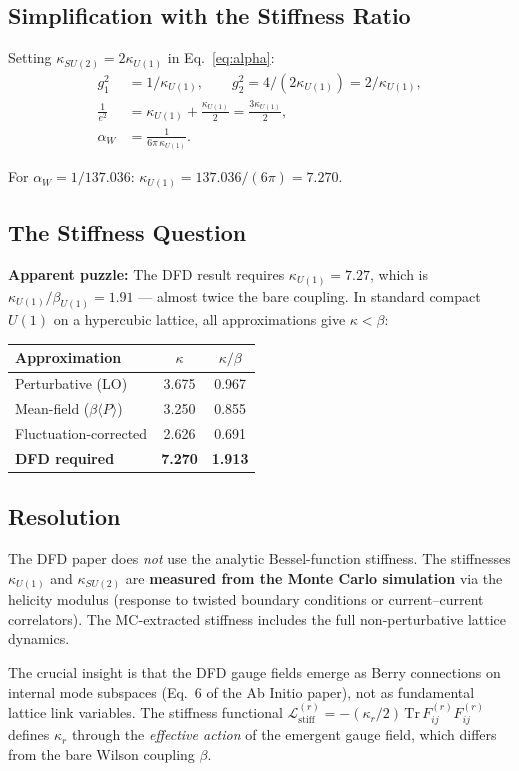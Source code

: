 \documentclass[12pt,a4paper]{article}
\newcommand{\bU}{\beta_{U(1)}}
\newcommand{\kU}{\kappa_{U(1)}}
\newcommand{\kS}{\kappa_{SU(2)}}
\newcommand{\aW}{\alpha_W}
\begin{document}
\subsection{Simplification with the Stiffness Ratio}

Setting $\kS = 2\kU$ in Eq.~\eqref{eq:alpha}:
\begin{align}
  g_1^2 &= 1/\kU, \qquad g_2^2 = 4/(2\kU) = 2/\kU, \\
  \frac{1}{e^2} &= \kU + \frac{\kU}{2} = \frac{3\kU}{2}, \\
  \aW &= \frac{1}{6\pi\,\kU}.
\end{align}

For $\aW = 1/137.036$: \quad $\kU = 137.036/(6\pi) = 7.270$.

\subsection{The Stiffness Question}

\textbf{Apparent puzzle:} The DFD result requires $\kU = 7.27$, which is
$\kU/\bU = 1.91$ --- almost twice the bare coupling.  In standard compact
$U(1)$ on a hypercubic lattice, all approximations give $\kappa < \beta$:
\begin{center}
\begin{tabular}{@{}lcc@{}}
\toprule
Approximation & $\kappa$ & $\kappa/\beta$ \\
\midrule
Perturbative (LO) & 3.675 & 0.967 \\
Mean-field ($\beta\langle P\rangle$) & 3.250 & 0.855 \\
Fluctuation-corrected & 2.626 & 0.691 \\
\midrule
\textbf{DFD required} & \textbf{7.270} & \textbf{1.913} \\
\bottomrule
\end{tabular}
\end{center}

\subsection{Resolution}

The DFD paper does \emph{not} use the analytic Bessel-function stiffness.
The stiffnesses $\kU$ and $\kS$ are \textbf{measured from the Monte Carlo
simulation} via the helicity modulus (response to twisted boundary conditions
or current--current correlators).  The MC-extracted stiffness includes the
full non-perturbative lattice dynamics.

The crucial insight is that the DFD gauge fields emerge as Berry connections
on internal mode subspaces (Eq.~6 of the Ab Initio paper), not as
fundamental lattice link variables.  The stiffness functional
$\mathcal{L}_{\text{stiff}}^{(r)} = -(\kappa_r/2)\,\mathrm{Tr}\,F_{ij}^{(r)}F_{ij}^{(r)}$
defines $\kappa_r$ through the \emph{effective action} of the emergent gauge
field, which differs from the bare Wilson coupling $\beta$.
\end{document}
